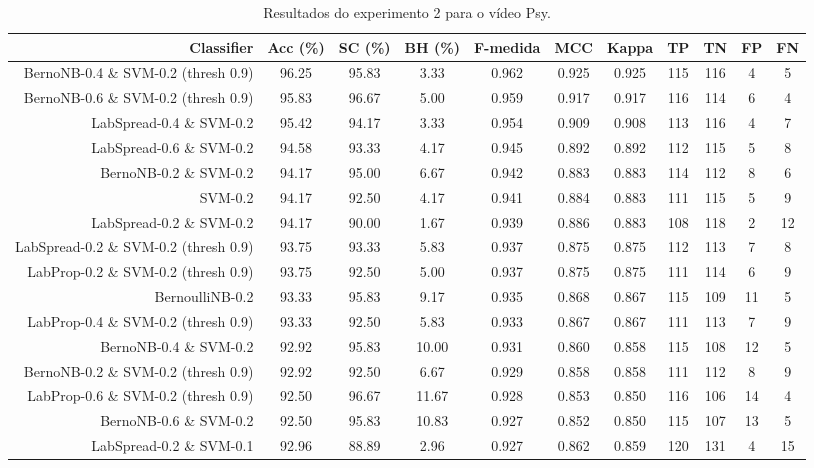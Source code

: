 \begin{table}[!htb]
\centering
\caption{Resultados do experimento 2 para o vídeo Psy.}
\label{tab:Psy}
\begin{tabular}{r|c|c|c|c|c|c|c|c|c|c}
\hline\hline
Classifier & Acc (\%) & SC (\%) & BH (\%) & F-medida & MCC & Kappa & TP & TN & FP & FN \\ \hline
BernoNB-0.4 \& SVM-0.2 (thresh 0.9) & 96.25 & 95.83 & 3.33 & 0.962 & 0.925 & 0.925 & 115 & 116 & 4 & 5 \\ 
BernoNB-0.6 \& SVM-0.2 (thresh 0.9) & 95.83 & 96.67 & 5.00 & 0.959 & 0.917 & 0.917 & 116 & 114 & 6 & 4 \\ 
LabSpread-0.4 \& SVM-0.2 & 95.42 & 94.17 & 3.33 & 0.954 & 0.909 & 0.908 & 113 & 116 & 4 & 7 \\ 
LabSpread-0.6 \& SVM-0.2 & 94.58 & 93.33 & 4.17 & 0.945 & 0.892 & 0.892 & 112 & 115 & 5 & 8 \\ 
BernoNB-0.2 \& SVM-0.2 & 94.17 & 95.00 & 6.67 & 0.942 & 0.883 & 0.883 & 114 & 112 & 8 & 6 \\ 
SVM-0.2 & 94.17 & 92.50 & 4.17 & 0.941 & 0.884 & 0.883 & 111 & 115 & 5 & 9 \\ 
LabSpread-0.2 \& SVM-0.2 & 94.17 & 90.00 & 1.67 & 0.939 & 0.886 & 0.883 & 108 & 118 & 2 & 12 \\ 
LabSpread-0.2 \& SVM-0.2 (thresh 0.9) & 93.75 & 93.33 & 5.83 & 0.937 & 0.875 & 0.875 & 112 & 113 & 7 & 8 \\ 
LabProp-0.2 \& SVM-0.2 (thresh 0.9) & 93.75 & 92.50 & 5.00 & 0.937 & 0.875 & 0.875 & 111 & 114 & 6 & 9 \\ 
BernoulliNB-0.2 & 93.33 & 95.83 & 9.17 & 0.935 & 0.868 & 0.867 & 115 & 109 & 11 & 5 \\ 
LabProp-0.4 \& SVM-0.2 (thresh 0.9) & 93.33 & 92.50 & 5.83 & 0.933 & 0.867 & 0.867 & 111 & 113 & 7 & 9 \\ 
BernoNB-0.4 \& SVM-0.2 & 92.92 & 95.83 & 10.00 & 0.931 & 0.860 & 0.858 & 115 & 108 & 12 & 5 \\ 
BernoNB-0.2 \& SVM-0.2 (thresh 0.9) & 92.92 & 92.50 & 6.67 & 0.929 & 0.858 & 0.858 & 111 & 112 & 8 & 9 \\ 
LabProp-0.6 \& SVM-0.2 (thresh 0.9) & 92.50 & 96.67 & 11.67 & 0.928 & 0.853 & 0.850 & 116 & 106 & 14 & 4 \\ 
BernoNB-0.6 \& SVM-0.2 & 92.50 & 95.83 & 10.83 & 0.927 & 0.852 & 0.850 & 115 & 107 & 13 & 5 \\ 
LabSpread-0.2 \& SVM-0.1 & 92.96 & 88.89 & 2.96 & 0.927 & 0.862 & 0.859 & 120 & 131 & 4 & 15 \\ 

\end{tabular}
\end{table}
